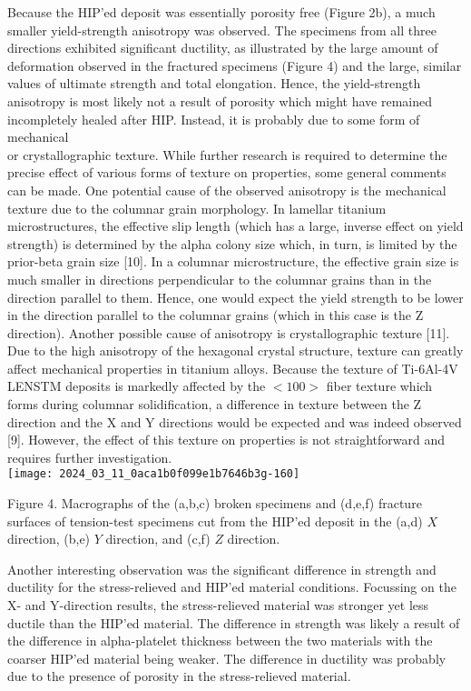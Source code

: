 \documentclass[10pt]{article}
\begin{document}
Because the HIP'ed deposit was essentially porosity free (Figure 2b), a much smaller yield-strength anisotropy was observed. The specimens from all three directions exhibited significant ductility, as illustrated by the large amount of deformation observed in the fractured specimens (Figure 4) and the large, similar values of ultimate strength and total elongation. Hence, the yield-strength anisotropy is most likely not a result of porosity which might have remained incompletely healed after HIP. Instead, it is probably due to some form of mechanical\\
or crystallographic texture. While further research is required to determine the precise effect of various forms of texture on properties, some general comments can be made. One potential cause of the observed anisotropy is the mechanical texture due to the columnar grain morphology. In lamellar titanium microstructures, the effective slip length (which has a large, inverse effect on yield strength) is determined by the alpha colony size which, in turn, is limited by the prior-beta grain size [10]. In a columnar microstructure, the effective grain size is much smaller in directions perpendicular to the columnar grains than in the direction parallel to them. Hence, one would expect the yield strength to be lower in the direction parallel to the columnar grains (which in this case is the $\mathrm{Z}$ direction). Another possible cause of anisotropy is crystallographic texture [11]. Due to the high anisotropy of the hexagonal crystal structure, texture can greatly affect mechanical properties in titanium alloys. Because the texture of Ti-6Al-4V LENSTM deposits is markedly affected by the $<100>$ fiber texture which forms during columnar solidification, a difference in texture between the $\mathrm{Z}$ direction and the $\mathrm{X}$ and Y directions would be expected and was indeed observed [9]. However, the effect of this texture on properties is not straightforward and requires further investigation.\\
\texttt{[image: 2024\_03\_11\_0aca1b0f099e1b7646b3g-160]}

Figure 4. Macrographs of the (a,b,c) broken specimens and (d,e,f) fracture surfaces of tension-test specimens cut from the HIP'ed deposit in the (a,d) $X$ direction, (b,e) $Y$ direction, and (c,f) $Z$ direction.

Another interesting observation was the significant difference in strength and ductility for the stress-relieved and HIP'ed material conditions. Focussing on the X- and Y-direction results, the stress-relieved material was stronger yet less ductile than the HIP'ed material. The difference in strength was likely a result of the difference in alpha-platelet thickness between the two materials with the coarser HIP'ed material being weaker. The difference in ductility was probably due to the presence of porosity in the stress-relieved material.
\end{document}
